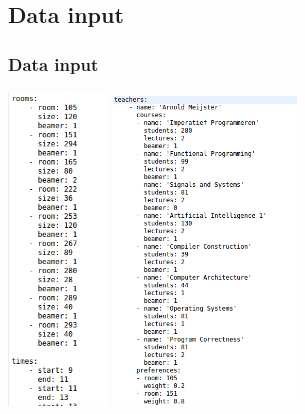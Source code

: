 \documentclass{beamer}
\begin{document}
\subsection{Data input}
\begin{frame}
	\frametitle{Data input}
	\center{}
	\includegraphics[width=0.2\textwidth]{Rooms.png}%
	\includegraphics[width=0.365\textwidth]{Teachers.png}
\end{frame}
\end{document}
